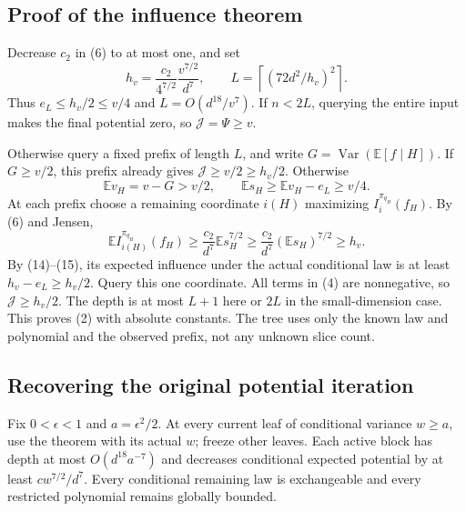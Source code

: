\subsection{Proof of the influence
theorem}\label{influence-recovery:proof-of-the-influence-theorem}

Decrease \(c_2\) in (6) to at most one, and set \[
 h_v=\frac{c_2}{4^{7/2}}\frac{v^{7/2}}{d^7},\qquad
 L=\left\lceil(72d^2/h_v)^2\right\rceil.                 \tag{16}
\] Thus \(e_L\le h_v/2\le v/4\) and \(L=O(d^{18}/v^7)\). If \(n<2L\),
querying the entire input makes the final potential zero, so
\(\mathcal J=\Psi\ge v\).

Otherwise query a fixed prefix of length \(L\), and write
\(G=\operatorname{Var}(\mathbb E[f\mid H])\). If \(G\ge v/2\), this
prefix already gives \(\mathcal J\ge v/2\ge h_v/2\). Otherwise \[
 \mathbb E v_H=v-G>v/2,\qquad
 \mathbb E s_H\ge\mathbb E v_H-e_L\ge v/4.               \tag{17}
\] At each prefix choose a remaining coordinate \(i(H)\) maximizing
\(I_i^{\pi_{q_H}}(f_H)\). By (6) and Jensen, \[
 \mathbb E I_{i(H)}^{\pi_{q_H}}(f_H)
 \ge\frac{c_2}{d^7}\mathbb E s_H^{7/2}
 \ge\frac{c_2}{d^7}(\mathbb E s_H)^{7/2}\ge h_v.          \tag{18}
\] By (14)--(15), its expected influence under the actual conditional
law is at least \(h_v-e_L\ge h_v/2\). Query this one coordinate. All
terms in (4) are nonnegative, so \(\mathcal J\ge h_v/2\). The depth is
at most \(L+1\) here or \(2L\) in the small-dimension case. This proves
(2) with absolute constants. The tree uses only the known law and
polynomial and the observed prefix, not any unknown slice count.

\subsection{Recovering the original potential
iteration}\label{influence-recovery:recovering-the-original-potential-iteration}

Fix \(0<\epsilon<1\) and \(a=\epsilon^2/2\). At every current leaf of
conditional variance \(w\ge a\), use the theorem with its actual \(w\);
freeze other leaves. Each active block has depth at most
\(O(d^{18}a^{-7})\) and decreases conditional expected potential by at
least \(c w^{7/2}/d^7\). Every conditional remaining law is exchangeable
and every restricted polynomial remains globally bounded.

